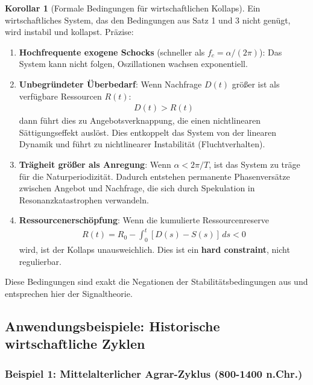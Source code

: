 \documentclass[a4paper, 12pt, twoside, openright]{report}
\theoremstyle{definition}
\theoremstyle{definition}
\newtheorem{korollar}{Korollar}[chapter]
\begin{document}
\begin{korollar}[Formale Bedingungen für wirtschaftlichen Kollaps]

Ein wirtschaftliches System, das den Bedingungen aus Satz 1 und 3 nicht genügt, wird instabil und kollapst. Präzise:

\begin{enumerate}

\item \textbf{Hochfrequente exogene Schocks} (schneller als $f_c = \alpha/(2\pi)$): Das System kann nicht folgen, Oszillationen wachsen exponentiell.

\item \textbf{Unbegründeter Überbedarf}: Wenn Nachfrage $D(t)$ größer ist als verfügbare Ressourcen $R(t)$:
\begin{align}
D(t) > R(t)
\end{align}
dann führt dies zu Angebotsverknappung, die einen nichtlinearen Sättigungseffekt auslöst. Dies entkoppelt das System von der linearen Dynamik und führt zu nichtlinearer Instabilität (Fluchtverhalten).

\item \textbf{Trägheit größer als Anregung}: Wenn $\alpha < 2\pi/T$, ist das System zu träge für die Naturperiodizität. Dadurch entstehen permanente Phasenversätze zwischen Angebot und Nachfrage, die sich durch Spekulation in Resonanzkatastrophen verwandeln.

\item \textbf{Ressourcenerschöpfung}: Wenn die kumulierte Ressourcenreserve
\begin{align}
R(t) = R_0 - \int_0^t [D(s) - S(s)] \, ds < 0
\end{align}
wird, ist der Kollaps unausweichlich. Dies ist ein \textbf{hard constraint}, nicht regulierbar.

\end{enumerate}

Diese Bedingungen sind exakt die Negationen der Stabilitätsbedingungen aus \cite{epp_signal} und entsprechen hier der Signaltheorie.

\end{korollar}

\subsection{Anwendungsbeispiele: Historische wirtschaftliche Zyklen}

\subsubsection{Beispiel 1: Mittelalterlicher Agrar-Zyklus (800-1400 n.Chr.)}
\end{document}

